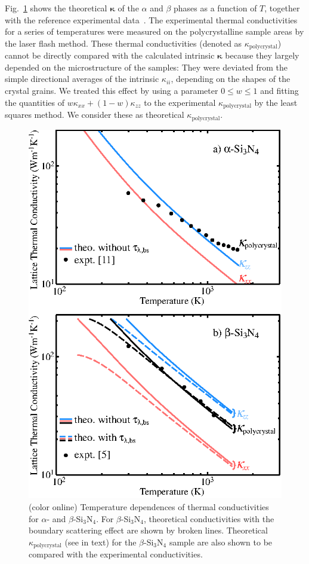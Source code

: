 \documentclass[twocolumn,amsmath,amssymb,a4paper,prb,superscriptaddress,floatfix]{revtex4-1}
\begin{document}
Fig.~\ref{fig:Fig1_338} shows the theoretical $\boldsymbol{\kappa}$ of the
$\alpha$ and $\beta$ phases as a function of $T$, together with the reference
experimental data~\cite{hirosaki,hirai}. The experimental thermal conductivities
for a series of temperatures were measured on the polycrystalline sample areas
by the laser flash method. These thermal conductivities (denoted as
$\kappa_\mathrm{polycrystal}$) cannot be directly compared with the calculated
intrinsic $\boldsymbol{\kappa}$ because they largely depended on the
microstructure of the samples: They were deviated from the simple directional
averages of the intrinsic $\kappa_{ii}$, depending on the shapes of the crystal
grains.  We treated this effect by using a parameter $0\le{w}\le{1}$ and fitting
the quantities of $w\kappa_{xx} + (1-w) \kappa_{zz}$ to the experimental
$\kappa_\mathrm{polycrystal}$ by the least squares method. We consider these as
theoretical $\kappa_\mathrm{polycrystal}$. 

\begin{figure}[ht]
 \begin{center}
  \includegraphics[width=0.90\linewidth]{Fig1_m1010.eps} \caption{(color
  online) Temperature dependences of thermal conductivities for $\alpha$- and
  $\beta$-Si$_3$N$_4$. For $\beta$-Si$_3$N$_4$, theoretical conductivities with the
  boundary scattering effect are shown by broken lines. Theoretical
  $\kappa_\mathrm{polycrystal}$ 
  (see in text) for the $\beta$-Si$_3$N$_4$ sample are
  also shown to be compared with the experimental conductivities.}
  \label{fig:Fig1_338}
 \end{center}
\end{figure}
\end{document}
